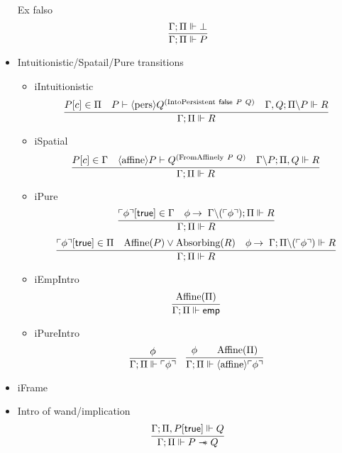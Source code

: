 \begin{itemize}
  Ex falso
  \[
  \infer{\entailsD P}
        {\entailsD \bot}
  \]
\item Intuitionistic/Spatail/Pure transitions
  \begin{itemize}
  \item iIntuitionistic
    \[
    \infer{\entailsD R}
          {P[c] \in \SpatD &
           P \vdash \pers Q^{(\text{IntoPersistent}\ \false\ P\ Q)} &
           \entails {\IntuD, Q} {\SpatD \backslash P} {R}
         }
    \]
  \item iSpatial
    \[
    \infer{\entailsD R}
          {P[c] \in \IntuD &
           \affine P \vdash Q^{(\text{FromAffinely}\ P\ Q)} &
           \entails {\IntuD \backslash P} {\SpatD, Q} {R}
         }
    \]
  \item iPure
    \[
    \infer{\entailsD R}
          {\pure{\phi}[\true] \in \IntuD &
           \phi \imp \entails {\IntuD \backslash (\pure{\phi})} {\SpatD} {R}
         }
    \]
    \[
    \infer{\entailsD R}
          {\pure{\phi}[\true] \in \SpatD &
           \Affine{P} \vee \Absorbing{R} &
           \phi \imp \entails {\IntuD} {\SpatD \backslash (\pure{\phi})} {R}
         }
    \]
  \item iEmpIntro
    \[
    \infer{\entailsD \emp}
          {\Affine{\SpatD}}
    \]
  \item iPureIntro
    \begin{equation}
    \infer{\entailsD {\pure \phi}}
          {\phi}
    \quad
    \infer{\entailsD {\affine \pure \phi }}
          {\phi & &
           \Affine{\SpatD}
          }
    \end{equation}
  \end{itemize}
\item iFrame
\item Intro of wand/implication
  \[
  \infer{\entailsD P \wand Q}
        {\entails {\IntuD} {\SpatD , P[\true]} {Q}}
  \]


\end{itemize}
